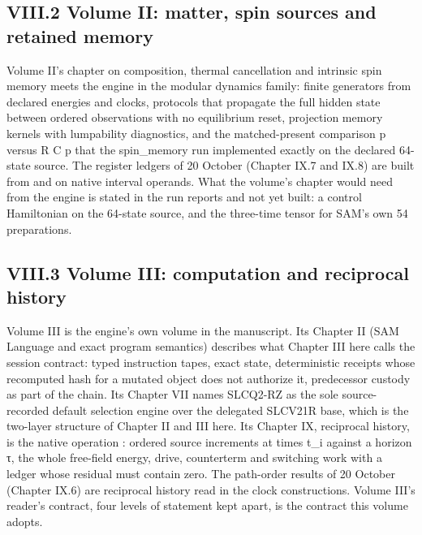 \subsection{VIII.2 Volume II: matter, spin sources and retained memory}\label{viii.2-volume-ii-matter-spin-sources-and-retained-memory}

Volume II's chapter on composition, thermal cancellation and intrinsic spin memory meets the engine in the modular dynamics family: finite
generators from declared energies and clocks, protocols that propagate the full hidden state between ordered observations with no
equilibrium reset, projection memory kernels with lumpability diagnostics, and the matched-present comparison p versus R C p that the
spin\_memory run implemented exactly on the declared 64-state source. The register ledgers of 20 October (Chapter IX.7 and IX.8) are built from
 and  on native interval operands. What the volume's chapter would need from the engine is stated in the run
reports and not yet built: a control Hamiltonian on the 64-state source, and the three-time tensor for SAM's own 54 preparations.

\subsection{VIII.3 Volume III: computation and reciprocal history}\label{viii.3-volume-iii-computation-and-reciprocal-history}

Volume III is the engine's own volume in the manuscript. Its Chapter II (SAM Language and exact program semantics) describes what Chapter III
here calls the session contract: typed instruction tapes, exact state, deterministic receipts whose recomputed hash for a mutated object does
not authorize it, predecessor custody as part of the chain. Its Chapter VII names SLCQ2-RZ as the sole source-recorded default selection
engine over the delegated SLCV21R base, which is the two-layer structure of Chapter II and III here. Its Chapter IX, reciprocal history, is
the native operation : ordered source increments at times t\_i against a horizon τ, the whole free-field energy,
drive, counterterm and switching work with a ledger whose residual must contain zero. The path-order results of 20 October (Chapter IX.6) are
reciprocal history read in the clock constructions. Volume III's reader's contract, four levels of statement kept apart, is the contract this
volume adopts.

\label{collaborative-work-nine-runs-and-one-release}

